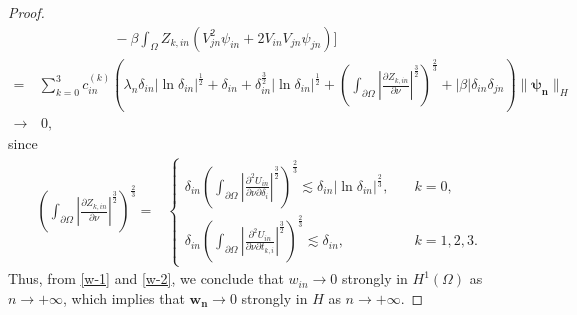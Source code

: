 \documentclass[a4paper,reqno,11pt,oneside]{amsart}
\numberwithin{equation}{section}
\begin{document}
\begin{proof}
\begin{align}
  &\qquad\,\quad\,\qquad-\beta\displaystyle\int_{\Omega}Z_{k,in}\left(V_{jn}^2\psi_{in}+2V_{in}V_{jn}\psi_{jn}\right)\Bigg]\nonumber\\
  =&\sum_{k=0}^3c_{in}^{(k)}\left(\lambda_n\delta_{in}|\ln{\delta_{in}}|^{\frac{1}{2}}+\delta_{in}+\delta^{\frac{3}{2}}_{in}|\ln{\delta_{in}}|^{\frac{1}{2}}+\left(\displaystyle\int_{\partial\Omega}\left|\frac{\partial Z_{k,in}}{\partial \nu}\right|^{\frac{3}{2}}\right)^{\frac{2}{3}}+{|\beta|\delta_{in}\delta_{jn}}\right)\|\bm{\psi_{n}}\|_{H}\nonumber\\ 
  \longrightarrow&\, 0,
\end{align}
since \begin{align*}
\left(\displaystyle\int_{\partial\Omega}\left|\frac{\partial Z_{k,in}}{\partial \nu}\right|^{\frac{3}{2}}\right)^{\frac{2}{3}}=&\begin{cases}
\delta_{in}\left(\displaystyle\int_{\partial\Omega}\left|\frac{\partial^{2} U_{in}}{\partial\nu\partial \delta_i}\right|^{\frac{3}{2}}\right)^{\frac{2}{3}}\lesssim \delta_{in}|\ln{\delta_{in}}|^{\frac{2}{3}},\quad &k=0,\\
\delta_{in}\left(\displaystyle\int_{\partial\Omega}\left|\frac{\partial^{2} U_{in}}{\partial\nu\partial t_{k,i}}\right|^{\frac{3}{2}}\right)^{\frac{2}{3}}\lesssim \delta_{in},\quad &k=1,2,3.
    \end{cases}
\end{align*}
Thus, from \eqref{w-1} and \eqref{w-2}, we conclude that $w_{{in}} \rightarrow 0$ strongly in $H^{1}(\Omega)$ as $n \rightarrow+\infty$, which implies that $\bm{w_{{n}}} \rightarrow 0$ strongly in $H$ as $n \rightarrow+\infty$.
\medskip


\end{proof}
\end{document}
